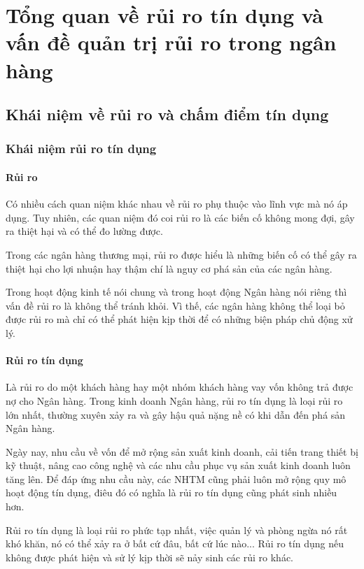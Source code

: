 \section{Tổng quan về rủi ro tín dụng và vấn đề quản trị rủi ro trong ngân hàng}
\subsection{Khái niệm về rủi ro và chấm điểm tín dụng}
\subsubsection{Khái niệm rủi ro tín dụng}
\paragraph{Rủi ro}
Có nhiều cách quan niệm khác nhau về rủi ro phụ thuộc vào lĩnh vực mà nó áp dụng.  Tuy nhiên, các quan niệm đó  coi rủi ro là các biến cố không mong đợi, gây ra thiệt hại và có thể đo lường được.

Trong các ngân hàng thương mại, rủi ro được hiểu là những biến cố có thể gây ra thiệt hại cho lợi nhuận hay thậm chí là nguy cơ phá sản của các ngân hàng.

Trong hoạt động kinh tế nói chung và trong hoạt động Ngân hàng nói riêng thì vấn đề rủi ro là không thể tránh khỏi. Vì thế, các ngân hàng  không thể loại bỏ được rủi ro mà chỉ có thể phát hiện kịp thời để có những biện pháp chủ động xử lý.

\paragraph{Rủi ro tín dụng}
Là rủi ro do một khách hàng hay một nhóm khách hàng vay vốn không trả được nợ cho Ngân hàng. Trong kinh doanh Ngân hàng, rủi ro tín dụng là loại rủi ro lớn nhất, thường xuyên xảy ra và gây hậu quả nặng nề có khi dẫn đến phá sản Ngân hàng.

Ngày nay, nhu cầu về vốn để mở rộng sản xuất kinh doanh, cải tiến trang thiết bị kỹ thuật, nâng cao công nghệ và các nhu cầu phục vụ sản xuất kinh doanh luôn tăng lên. Để đáp ứng nhu cầu này, các NHTM cũng phải luôn mở rộng quy mô hoạt động tín dụng, điêu đó có nghĩa là rủi ro tín dụng cũng phát sinh nhiều hơn.

Rủi ro tín dụng là loại rủi ro phức tạp nhất, việc quản lý và phòng ngừa nó rất khó khăn, nó có thể xảy ra ở bất cứ đâu, bất cứ lúc nào... Rủi ro tín dụng nếu không được phát hiện và sử lý kịp thời sẽ nảy sinh các rủi ro khác.

